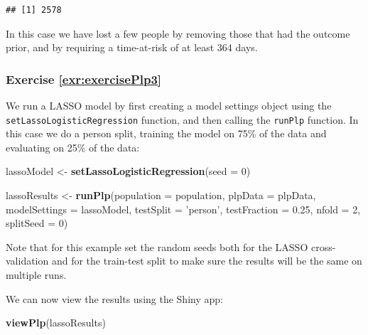 \documentclass[11pt]{book}
\newenvironment{Shaded}{\begin{snugshade}}{\end{snugshade}}
\newcommand{\DataTypeTok}[1]{\textcolor[rgb]{0.13,0.29,0.53}{#1}}
\newcommand{\DecValTok}[1]{\textcolor[rgb]{0.00,0.00,0.81}{#1}}
\newcommand{\FloatTok}[1]{\textcolor[rgb]{0.00,0.00,0.81}{#1}}
\newcommand{\KeywordTok}[1]{\textcolor[rgb]{0.13,0.29,0.53}{\textbf{#1}}}
\newcommand{\NormalTok}[1]{#1}
\newcommand{\StringTok}[1]{\textcolor[rgb]{0.31,0.60,0.02}{#1}}
\theoremstyle{definition}
\theoremstyle{definition}
\theoremstyle{definition}
\theoremstyle{remark}
\begin{document}
\begin{verbatim}
## [1] 2578
\end{verbatim}

In this case we have lost a few people by removing those that had the outcome prior, and by requiring a time-at-risk of at least 364 days.

\hypertarget{exercise-refexrexerciseplp3}{%
\subsubsection*{Exercise \ref{exr:exercisePlp3}}\label{exercise-refexrexerciseplp3}}

We run a LASSO model by first creating a model settings object using the \texttt{setLassoLogisticRegression} function, and then calling the \texttt{runPlp} function. In this case we do a person split, training the model on 75\% of the data and evaluating on 25\% of the data:

\begin{Shaded}
\begin{Highlighting}[]
\NormalTok{lassoModel <-}\StringTok{ }\KeywordTok{setLassoLogisticRegression}\NormalTok{(}\DataTypeTok{seed =} \DecValTok{0}\NormalTok{)}

\NormalTok{lassoResults <-}\StringTok{ }\KeywordTok{runPlp}\NormalTok{(}\DataTypeTok{population =}\NormalTok{ population, }
                       \DataTypeTok{plpData =}\NormalTok{ plpData, }
                       \DataTypeTok{modelSettings =}\NormalTok{ lassoModel, }
                       \DataTypeTok{testSplit =} \StringTok{'person'}\NormalTok{,}
                       \DataTypeTok{testFraction =} \FloatTok{0.25}\NormalTok{, }
                       \DataTypeTok{nfold =} \DecValTok{2}\NormalTok{, }
                       \DataTypeTok{splitSeed =} \DecValTok{0}\NormalTok{)}
\end{Highlighting}
\end{Shaded}

Note that for this example set the random seeds both for the LASSO cross-validation and for the train-test split to make sure the results will be the same on multiple runs.

We can now view the results using the Shiny app:

\begin{Shaded}
\begin{Highlighting}[]
\KeywordTok{viewPlp}\NormalTok{(lassoResults)}
\end{Highlighting}
\end{Shaded}
\end{document}
